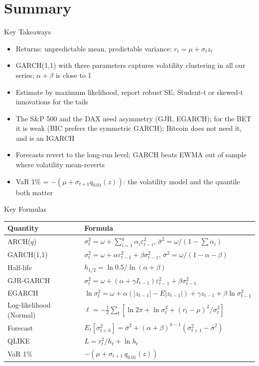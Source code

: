 \section{Summary}

\begin{frame}{Key Takeaways}
\itemsize{\small}
\begin{itemize}
    \item Returns: unpredictable mean, predictable variance: $r_t = \mu + \sigma_t z_t$
    \item GARCH(1,1) with three parameters captures volatility clustering in all our series; $\alpha + \beta$ is close to 1
    \item Estimate by maximum likelihood, report robust SE; Student-t or skewed-t innovations for the tails
    \item The S\&P 500 and the DAX need asymmetry (GJR, EGARCH); for the BET it is weak (BIC prefers the symmetric GARCH); Bitcoin does not need it, and is an IGARCH
    \item Forecasts revert to the long-run level; GARCH beats EWMA out of sample where volatility mean-reverts
    \item VaR 1\% = $-(\mu + \sigma_{t+1}q_{0.01}(z))$: the volatility model and the quantile both matter
\end{itemize}
\end{frame}

\begin{frame}{Key Formulas}
\itemsize{\small}
{\renewcommand{\arraystretch}{1.45}\begin{center}
\small
\begin{tabular}{ll}
\toprule
\textbf{Quantity} & \textbf{Formula} \\
\midrule
ARCH($q$) & $\sigma_t^2 = \omega + \sum_{i=1}^{q}\alpha_i\varepsilon_{t-i}^2$, \quad $\bar\sigma^2 = \omega/(1 - \sum\alpha_i)$ \\
GARCH(1,1) & $\sigma_t^2 = \omega + \alpha\varepsilon_{t-1}^2 + \beta\sigma_{t-1}^2$, \quad $\bar\sigma^2 = \omega/(1 - \alpha - \beta)$ \\
Half-life & $h_{1/2} = \ln 0.5/\ln(\alpha + \beta)$ \\
GJR-GARCH & $\sigma_t^2 = \omega + (\alpha + \gamma I_{t-1})\varepsilon_{t-1}^2 + \beta\sigma_{t-1}^2$ \\
EGARCH & $\ln\sigma_t^2 = \omega + \alpha(|z_{t-1}| - E|z_{t-1}|) + \gamma z_{t-1} + \beta\ln\sigma_{t-1}^2$ \\
Log-likelihood (Normal) & $\ell = -\frac12\sum_t[\ln 2\pi + \ln\sigma_t^2 + (r_t - \mu)^2/\sigma_t^2]$ \\
Forecast & $E_t[\sigma_{t+h}^2] = \bar\sigma^2 + (\alpha + \beta)^{h-1}(\sigma_{t+1}^2 - \bar\sigma^2)$ \\
QLIKE & $L = r_t^2/h_t + \ln h_t$ \\
VaR 1\% & $-(\mu + \sigma_{t+1}\,q_{0.01}(z))$ \\
\bottomrule
\end{tabular}
\end{center}
}
\end{frame}

